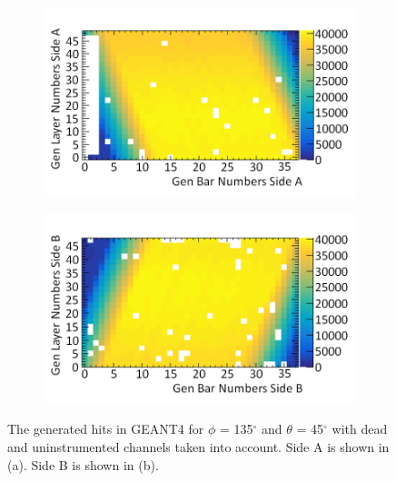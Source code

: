 \begin{figure}[!h]
\centering
\begin{subfigure}{.5\textwidth}
  \centering
  \includegraphics[width=\linewidth]{Chapter6/Figs/Raster/sideAGen_PVsT_135_45MedText.png}
  \captionsetup{width=.9\linewidth}
  \caption{}
  \label{subFig:sideAGen_PVsT_135_45}
\end{subfigure}%
\begin{subfigure}{.5\textwidth}
  \centering
\includegraphics[width=\linewidth]{Chapter6/Figs/Raster/sideBGen_PVsT_135_45MedText.png}
  \captionsetup{width=.9\linewidth}
  \caption{}
  \label{subFig:sideBGen_PVsT_135_45}
\end{subfigure}
\caption{The generated hits in GEANT4 for $\phi$ = 135$^\circ$ and $\theta$ = 45$^\circ$ with dead and uninstrumented channels taken into account. Side A is shown in (a). Side B is shown in (b).}
\label{fig:sideABGen_PVsT_135_45}
\end{figure}

